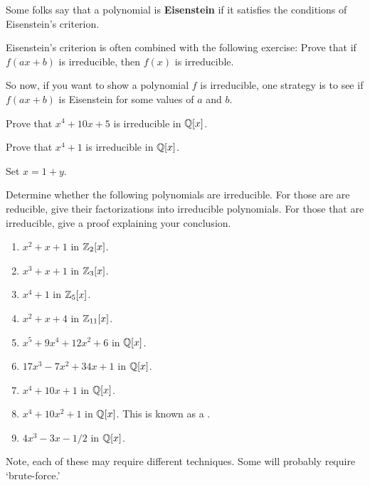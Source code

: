 \documentclass{ximera}
\begin{document}
Some folks say that a polynomial is \textbf{Eisenstein} if it satisfies
the conditions of Eisenstein's criterion. 

\begin{exercise}
  Eisenstein's criterion is often combined with the following
  exercise: Prove that if $f(ax+b)$ is irreducible, then $f(x)$ is
  irreducible.


  So now, if you want to show a polynomial $f$ is irreducible, one
  strategy is to see if $f(ax+b)$ is Eisenstein for some values of
  $a$ and $b$.
\end{exercise}


\begin{exercise}
  Prove that $x^4 + 10x + 5$ is irreducible in $\mathbb Q[x]$.
\end{exercise}



\begin{exercise}
  Prove that $x^4 + 1$ is irreducible in $\mathbb Q[x]$.
  \begin{hint}
    Set $x = 1+y$.
  \end{hint}
\end{exercise}


\begin{exercise}
  Determine whether the following polynomials are irreducible. For those
  are are reducible, give their factorizations into irreducible
  polynomials. For those that are irreducible, give a proof explaining
  your conclusion.
  \begin{enumerate}
  \item $x^2 + x +1$ in $\mathbb Z_2[x]$.
  \item $x^3 + x + 1$ in $\mathbb Z_3[x]$.
  \item $x^4+1$ in $\mathbb Z_5[x]$.
  \item $x^2 + x + 4$ in $\mathbb Z_{11}[x]$.
  \item $x^5 + 9x^4 + 12x^2 + 6$ in  $\mathbb Q[x]$.
  \item $17 x^3 - 7x^2 + 34x + 1$ in $\mathbb Q[x]$.
  \item $x^4 + 10x + 1$ in $\mathbb Q[x]$.
  \item $x^4 + 10x^2 + 1$ in $\mathbb Q[x]$. This is known as a
    .
  \item $4x^3 -3x -1/2$ in $\mathbb Q[x]$.
  \end{enumerate}
  \begin{hint}
    Note, each of these may require different techniques. Some will
    probably require `brute-force.'
  \end{hint}
\end{exercise}
\end{document}
